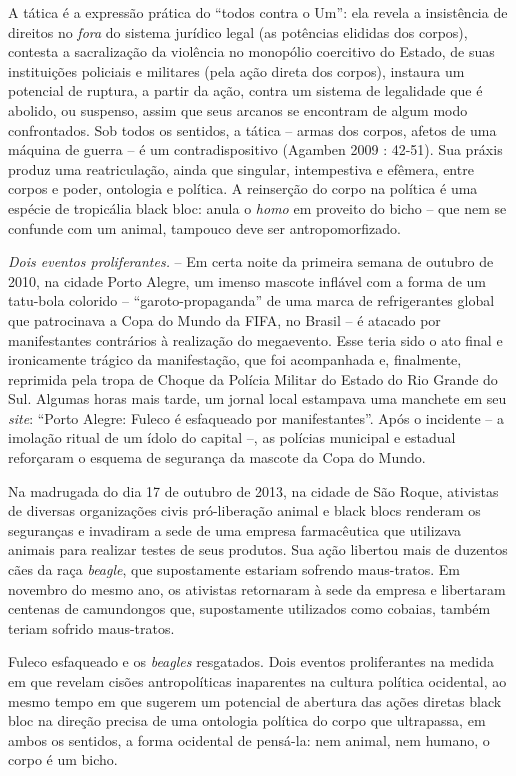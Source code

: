 A tática é a expressão prática do ``todos contra o Um'': ela revela a
insistência de direitos no \emph{fora} do sistema jurídico legal (as
potências elididas dos corpos), contesta a sacralização da violência no
monopólio coercitivo do Estado, de suas instituições policiais e
militares (pela ação direta dos corpos), instaura um potencial de
ruptura, a partir da ação, contra um sistema de legalidade que é
abolido, ou suspenso, assim que seus arcanos se encontram de algum modo
confrontados. Sob todos os sentidos, a tática -- armas dos corpos,
afetos de uma máquina de guerra -- é um contradispositivo (Agamben 2009
: 42-51). Sua práxis produz uma reatriculação, ainda que singular,
intempestiva e efêmera, entre corpos e poder, ontologia e política. A
reinserção do corpo na política é uma espécie de tropicália black bloc:
anula o \emph{homo} em proveito do bicho -- que nem se confunde com um
animal, tampouco deve ser antropomorfizado.

\emph{Dois eventos proliferantes.} -- Em certa noite da primeira semana
de outubro de 2010, na cidade Porto Alegre, um imenso mascote inflável
com a forma de um tatu-bola colorido -- ``garoto-propaganda'' de uma
marca de refrigerantes global que patrocinava a Copa do Mundo da FIFA,
no Brasil -- é atacado por manifestantes contrários à realização do
megaevento. Esse teria sido o ato final e ironicamente trágico da
manifestação, que foi acompanhada e, finalmente, reprimida pela tropa de
Choque da Polícia Militar do Estado do Rio Grande do Sul. Algumas horas
mais tarde, um jornal local estampava uma manchete em seu \emph{site}:
``Porto Alegre: Fuleco é esfaqueado por manifestantes''. Após o
incidente -- a imolação ritual de um ídolo do capital --, as polícias
municipal e estadual reforçaram o esquema de segurança da mascote da
Copa do Mundo.

Na madrugada do dia 17 de outubro de 2013, na cidade de São Roque,
ativistas de diversas organizações civis pró-liberação animal e black
blocs renderam os seguranças e invadiram a sede de uma empresa
farmacêutica que utilizava animais para realizar testes de seus
produtos. Sua ação libertou mais de duzentos cães da raça \emph{beagle},
que supostamente estariam sofrendo maus-tratos. Em novembro do mesmo
ano, os ativistas retornaram à sede da empresa e libertaram centenas de
camundongos que, supostamente utilizados como cobaias, também teriam
sofrido maus-tratos.

Fuleco esfaqueado e os \emph{beagles} resgatados. Dois eventos
proliferantes na medida em que revelam cisões antropolíticas inaparentes
na cultura política ocidental, ao mesmo tempo em que sugerem um
potencial de abertura das ações diretas black bloc na direção precisa de
uma ontologia política do corpo que ultrapassa, em ambos os sentidos, a
forma ocidental de pensá-la: nem animal, nem humano, o corpo é um bicho.

